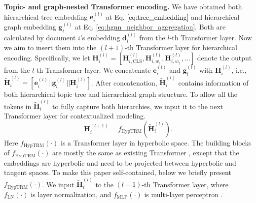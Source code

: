 \textbf{Topic- and graph-nested Transformer encoding.} We have obtained both hierarchical tree embedding $ \textbf{e}_i^{(l)} $ at Eq. \ref{eq:tree_embedding} and hierarchical graph embedding $ \textbf{g}_i^{(l)} $ at Eq. \ref{eq:hgnn_neighbor_aggregation}. Both are calculated by document $ i $'s embedding $ \textbf{d}_i^{(l)} $ from the $ l $-th Transformer layer. Now we aim to insert them into the $ (l+1) $-th Transformer layer for hierarchical encoding. Specifically, we let $ \textbf{H}_i^{(l)}=[\textbf{H}_{i,\text{CLS}}^{(l)},\textbf{H}_{i,w_1}^{(l)},\textbf{H}_{i,w_2}^{(l)},...] $ denote the output from the $ l $-th Transformer layer. We concatenate $ \textbf{e}_i^{(l)} $ and $ \textbf{g}_i^{(l)} $ with $ \textbf{H}_i^{(l)} $, i.e., $ \tilde{\textbf{H}}_i^{(l)}=[\textbf{e}_i^{(l)}||\textbf{g}_i^{(l)}||\textbf{H}_i^{(l)}] $. After concatenation, $ \tilde{\textbf{H}}_i^{(l)} $ contains information of both hierarchical topic tree and hierarchical graph structure. To allow all the tokens in $ \tilde{\textbf{H}}_i^{(l)} $ to fully capture both hierarchies, we input it to the next Transformer layer for contextualized modeling.
\begin{equation}
    \textbf{H}_i^{(l+1)}=f_{\text{HypTRM}}(\tilde{\textbf{H}}_i^{(l)}).
\end{equation}
Here $ f_{\text{HypTRM}}(\cdot) $ is a Transformer layer in hyperbolic space. %
The building blocks of $ f_{\text{HypTRM}}(\cdot) $ are mostly the same as existing Transformer \cite{transformer}, except that the embeddings are hyperbolic and need to be projected between hyperbolic and tangent spaces. To make this paper self-contained, below we briefly present $ f_{\text{HypTRM}}(\cdot) $. We input $ \tilde{\textbf{H}}_i^{(l)} $ to the $ (l+1) $-th Transformer layer, where $ f_{\text{LN}}(\cdot) $ is layer normalization, and $ f_{\text{MLP}}(\cdot) $ is multi-layer perceptron \cite{transformer}.
